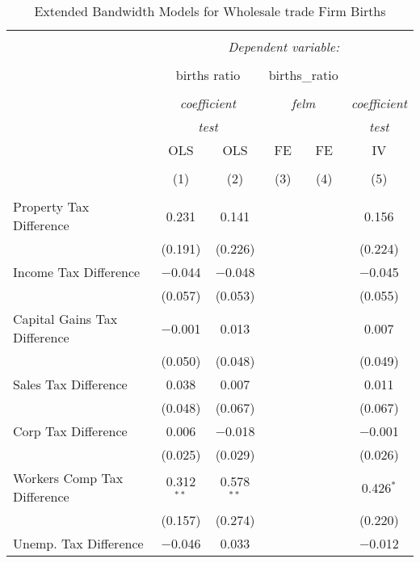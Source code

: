 
\begin{table}[!htbp] \centering 
  \caption{Extended Bandwidth Models for  Wholesale trade Firm Births} 
  \label{} 
\begin{tabular}{@{\extracolsep{5pt}}lccccc} 
\\[-1.8ex]\hline 
\hline \\[-1.8ex] 
 & \multicolumn{5}{c}{\textit{Dependent variable:}} \\ 
\cline{2-6} 
\\[-1.8ex] & \multicolumn{2}{c}{births ratio} & \multicolumn{2}{c}{births\_ratio} &   \\ 
\\[-1.8ex] & \multicolumn{2}{c}{\textit{coefficient}} & \multicolumn{2}{c}{\textit{felm}} & \textit{coefficient} \\ 
 & \multicolumn{2}{c}{\textit{test}} & \multicolumn{2}{c}{\textit{}} & \textit{test} \\ 
 & OLS & OLS & FE & FE & IV \\ 
\\[-1.8ex] & (1) & (2) & (3) & (4) & (5)\\ 
\hline \\[-1.8ex] 
 Property Tax Difference & 0.231 & 0.141 &  &  & 0.156 \\ 
  & (0.191) & (0.226) &  &  & (0.224) \\ 
  Income Tax Difference & $-$0.044 & $-$0.048 &  &  & $-$0.045 \\ 
  & (0.057) & (0.053) &  &  & (0.055) \\ 
  Capital Gains Tax Difference & $-$0.001 & 0.013 &  &  & 0.007 \\ 
  & (0.050) & (0.048) &  &  & (0.049) \\ 
  Sales Tax Difference & 0.038 & 0.007 &  &  & 0.011 \\ 
  & (0.048) & (0.067) &  &  & (0.067) \\ 
  Corp Tax Difference & 0.006 & $-$0.018 &  &  & $-$0.001 \\ 
  & (0.025) & (0.029) &  &  & (0.026) \\ 
  Workers Comp Tax Difference & 0.312$^{**}$ & 0.578$^{**}$ &  &  & 0.426$^{*}$ \\ 
  & (0.157) & (0.274) &  &  & (0.220) \\ 
  Unemp. Tax Difference & $-$0.046 & 0.033 &  &  & $-$0.012 \\ 

\end{tabular}
\end{table}
